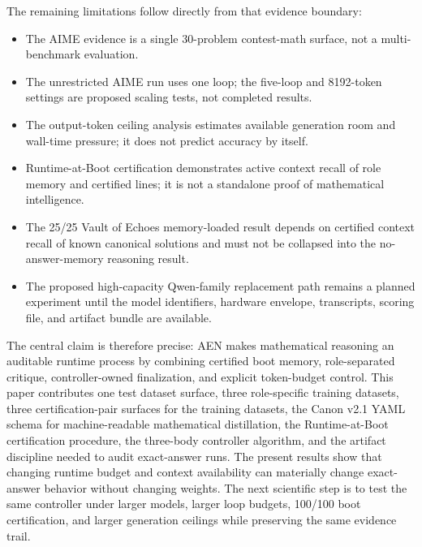 \documentclass[11pt]{article}
\begin{document}
The remaining limitations follow directly from that evidence boundary:

\begin{itemize}
  \item The AIME evidence is a single 30-problem contest-math surface, not a multi-benchmark evaluation.
  \item The unrestricted AIME run uses one loop; the five-loop and 8192-token settings are proposed scaling tests, not completed results.
  \item The output-token ceiling analysis estimates available generation room and wall-time pressure; it does not predict accuracy by itself.
  \item Runtime-at-Boot certification demonstrates active context recall of role memory and certified lines; it is not a standalone proof of mathematical intelligence.
  \item The 25/25 Vault of Echoes memory-loaded result depends on certified context recall of known canonical solutions and must not be collapsed into the no-answer-memory reasoning result.
  \item The proposed high-capacity Qwen-family replacement path remains a planned experiment until the model identifiers, hardware envelope, transcripts, scoring file, and artifact bundle are available.
\end{itemize}

The central claim is therefore precise: AEN makes mathematical reasoning an auditable runtime process by combining certified boot memory, role-separated critique, controller-owned finalization, and explicit token-budget control. This paper contributes one test dataset surface, three role-specific training datasets, three certification-pair surfaces for the training datasets, the Canon v2.1 YAML schema for machine-readable mathematical distillation, the Runtime-at-Boot certification procedure, the three-body controller algorithm, and the artifact discipline needed to audit exact-answer runs. The present results show that changing runtime budget and context availability can materially change exact-answer behavior without changing weights. The next scientific step is to test the same controller under larger models, larger loop budgets, 100/100 boot certification, and larger generation ceilings while preserving the same evidence trail.



\end{document}
